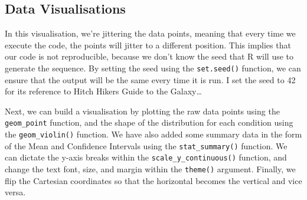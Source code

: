\documentclass[
]{article}
\begin{document}
\hypertarget{data-visualisations}{%
\subsection{Data Visualisations}\label{data-visualisations}}

In this visualisation, we're jittering the data points, meaning that
every time we execute the code, the points will jitter to a different
position. This implies that our code is not reproducible, because we
don't know the seed that R will use to generate the sequence. By setting
the seed using the \texttt{set.seed()} function, we can ensure that the
output will be the same every time it is run. I set the seed to 42 for
its reference to Hitch Hikers Guide to the Galaxy\ldots{}

Next, we can build a visualisation by plotting the raw data points using
the \texttt{geom\_point} function, and the shape of the distribution for
each condition using the \texttt{geom\_violin()} function. We have also
added some summary data in the form of the Mean and Confidence Intervals
using the \texttt{stat\_summary()} function. We can dictate the y-axis
breaks within the \texttt{scale\_y\_continuous()} function, and change
the text font, size, and margin within the \texttt{theme()} argument.
Finally, we flip the Cartesian coordinates so that the horizontal
becomes the vertical and vice versa.
\end{document}
